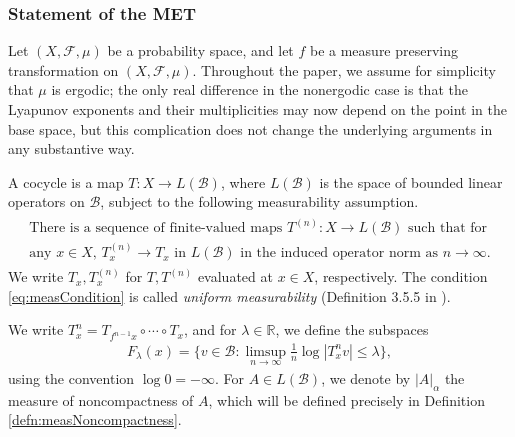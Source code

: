 \documentclass[11pt]{amsart}
\theoremstyle{theorem}
\theoremstyle{definition}
\numberwithin{equation}{section}
\newcommand{\R}{\mathbb{R}}
\newcommand{\Fc}{\mathcal{F}}
\renewcommand{\a}{\alpha}
\renewcommand{\l}{\lambda}
\newcommand{\Bc}{\mathcal{B}}
\begin{document}
\subsubsection{Statement of the MET}

Let $(X, \Fc, \mu)$ be a probability space, and let $f$ be a measure preserving transformation on $(X, \Fc, \mu)$. Throughout the paper, we assume for simplicity that $\mu$ is ergodic; the only real difference in the nonergodic case is that the Lyapunov exponents and their multiplicities may now depend on the point in the base space, but this complication does not change the underlying arguments in any substantive way.

A cocycle is a map $T : X \to L(\Bc)$, where $L(\Bc)$ is the space of bounded linear operators on $\Bc$, subject to the following measurability assumption.
\begin{align}\label{eq:measCondition}
\begin{split}
\text{There is a sequence of finite-valued} \text{ maps $T^{(n)} : X \to L(\Bc)$ such that for} \\
\text{any $x \in X$, $T^{(n)}_x \to T_x$ in } L(\Bc)  \text{ in the induced operator norm as $n \to \infty$.}
\end{split}
\end{align}
We write $T_x, T^{(n)}_x$ for $T, T^{(n)}$ evaluated at $x \in X$, respectively. The condition \eqref{eq:measCondition} is called \emph{uniform measurability} (Definition 3.5.5 in \cite{Hille}).

We write $T^n_x = T_{f^{n-1} x} \circ \cdots \circ T_x$, and for $\l \in \R$, we define the subspaces
\begin{align}\label{eq:slowGrowSpaces}
F_{\l}(x) = \{v \in \Bc : \limsup_{n \to \infty} \frac{1}{n} \log |T^n_x v| \leq \l \},
\end{align}
using the convention $\log 0 = - \infty$. For $A \in L(\Bc)$, we denote by $|A|_{\a}$ the measure of noncompactness of $A$, which will be defined precisely in Definition \ref{defn:measNoncompactness}.
 
\end{document}

